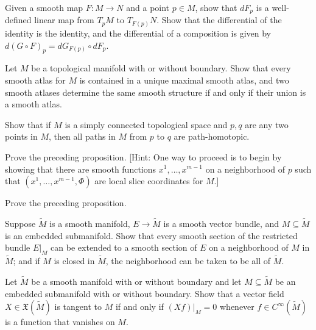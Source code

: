 \begin{exercise}\label{exer:differential-well-defined-functorial}
Given a smooth map $F: M \to N$ and a point $p \in M$, show that $dF_p$ is a well-defined linear map from $T_p M$ to $T_{F(p)} N$. Show that the differential of the identity is the identity, and the differential of a composition is given by $d(G \circ F)_p = dG_{F(p)} \circ dF_p$.
\end{exercise}

\begin{exercise}
\label{exer:maximal-smooth-atlas}
Let $M$ be a topological manifold with or without boundary. Show that every smooth atlas for $M$ is contained in a unique maximal smooth atlas, and two smooth atlases determine the same smooth structure if and only if their union is a smooth atlas.
\end{exercise}

\begin{exercise}
\label{exer:path-homotopy-simply-connected}
Show that if $M$ is a simply connected topological space and $p, q$ are any two points in $M$, then all paths in $M$ from $p$ to $q$ are path-homotopic.
\end{exercise}

\begin{exercise}
\label{exer:prove-lagrange-multiplier}
Prove the preceding proposition. [Hint: One way to proceed is to begin by showing that there are smooth functions $x^1, \ldots, x^{m-1}$ on a neighborhood of $p$ such that $(x^1, \ldots, x^{m-1}, \Phi)$ are local slice coordinates for $M$.]
\end{exercise}

\begin{exercise}
\label{exer:prove-prop-a50}
Prove the preceding proposition.
\end{exercise}

\begin{exercise}
\label{exer:smooth-section-extension}
Suppose $\tilde{M}$ is a smooth manifold, $E \to \tilde{M}$ is a smooth vector bundle, and $M \subseteq \tilde{M}$ is an embedded submanifold. Show that every smooth section of the restricted bundle $E|_M$ can be extended to a smooth section of $E$ on a neighborhood of $M$ in $\tilde{M}$; and if $M$ is closed in $\tilde{M}$, the neighborhood can be taken to be all of $\tilde{M}$.
\end{exercise}

\begin{exercise}
\label{exer:tangent-vector-field-on-submanifold}
Let $\tilde{M}$ be a smooth manifold with or without boundary and let $M \subseteq \tilde{M}$ be an embedded submanifold with or without boundary. Show that a vector field $X \in \mathfrak{X}(\tilde{M})$ is tangent to $M$ if and only if $(Xf)|_M = 0$ whenever $f \in C^\infty(\tilde{M})$ is a function that vanishes on $M$.
\end{exercise}
